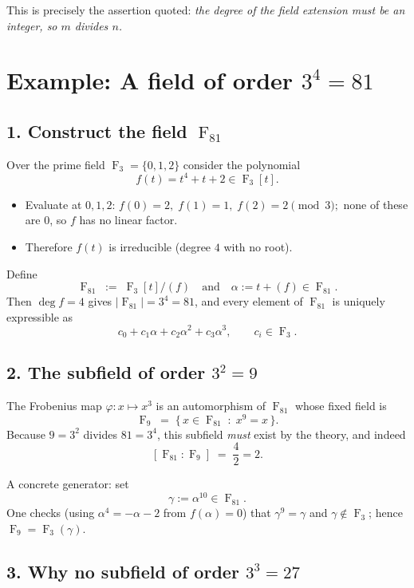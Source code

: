 \documentclass[12pt]{article}
\DeclareMathOperator{\F}{F}
\theoremstyle{definition} %
\theoremstyle{plain} %
\begin{document}
This is precisely the assertion quoted:  
\emph{the degree of the field extension must be an integer, so \(m\) divides \(n\).}

\section*{Example:  A field of order \(3^{4}=81\)}

\subsection*{1.  Construct the field \(\F_{81}\)}

Over the prime field \(\F_{3}=\{0,1,2\}\) consider the polynomial
\[
f(t)=t^{4}+t+2\in\F_{3}[t].
\]
\begin{itemize}
    \item  Evaluate at \(0,1,2\):
           \(
                f(0)=2,\;
                f(1)=1,\;
                f(2)=2\pmod3;
           \)
           none of these are \(0\), so \(f\) has no linear factor.
    \item  Therefore \(f(t)\) is irreducible (degree \(4\) with no root).
\end{itemize}

Define
\[
\F_{81}\;:=\;\F_{3}[t]/(f)\quad\text{and}\quad\alpha:=t+(f)\in\F_{81}.
\]
Then \(\deg f=4\) gives \(|\F_{81}|=3^{4}=81\), and every element of
\(\F_{81}\) is uniquely expressible as
\[
c_{0}+c_{1}\alpha+c_{2}\alpha^{2}+c_{3}\alpha^{3},
\qquad c_{i}\in\F_{3}.
\]

\subsection*{2.  The subfield of order \(3^{2}=9\)}

The Frobenius map \(\varphi:x\mapsto x^{3}\) is an automorphism of
\(\F_{81}\) whose fixed field is
\[
\F_{9}\;=\;\bigl\{\,x\in\F_{81}\;:\;x^{9}=x\,\bigr\}.
\]
Because \(9=3^{2}\) divides \(81=3^{4}\), this subfield \emph{must}
exist by the theory, and indeed
\[
[\F_{81}:\F_{9}] \;=\;\frac{4}{2}=2.
\]

A concrete generator:  set
\[
\gamma:=\alpha^{10}\in\F_{81}.
\]
One checks (using \(\alpha^{4}= -\alpha-2\) from \(f(\alpha)=0\)) that
\(\gamma^{9}=\gamma\) and \(\gamma\notin\F_{3}\); hence
\(\F_{9}=\F_{3}(\gamma)\).

\subsection*{3.  Why no subfield of order \(3^{3}=27\)}
\end{document}
